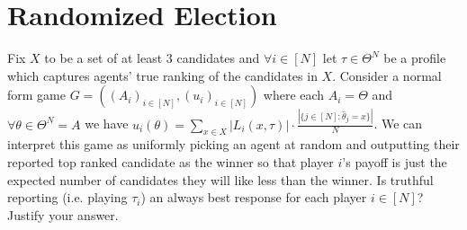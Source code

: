 \documentclass[11pt]{article}
\theoremstyle{definition}
\theoremstyle{plain}
\begin{document}
\section{Randomized Election}
Fix $X$ to be a set of at least 3 candidates and $\forall i \in [N]$ let $\tau \in \Theta^N$ be a profile which captures agents' true ranking of the candidates in $X$. Consider a normal form game $G=((A_i)_{i \in [N]},(u_i)_{i \in [N]})$ where each $A_i=\Theta$ and $\forall \theta \in \Theta^N=A$ we have $u_i(\theta)=\sum_{x \in X} |L_i(x,\tau)| \cdot \frac{|\{j \in [N]:\hat{\theta}_j=x\}|}{N}$. We can interpret this game as uniformly picking an agent at random and outputting their reported top ranked candidate as the winner so that player $i$'s payoff is just the expected number of candidates they will like less than the winner. Is truthful reporting (i.e. playing $\tau_i$) an always best response for each player $i \in [N]$? Justify your answer. 
\end{document}
